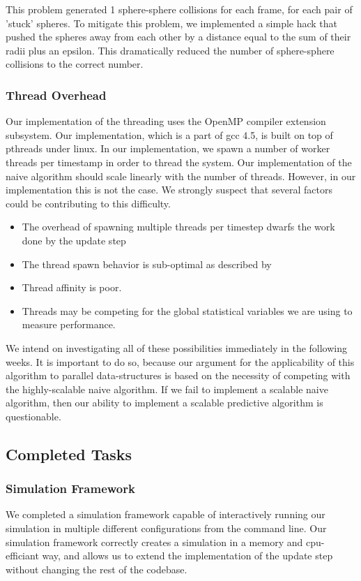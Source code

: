 \documentclass[conference]{IEEEtran}
\begin{document}
This problem generated 1 sphere-sphere collisions for each frame, for each pair of 'stuck' spheres.  To mitigate this problem, we implemented a simple hack that pushed the spheres away from each other by a distance equal to the sum of their radii plus an epsilon.
This dramatically reduced the number of sphere-sphere collisions to the correct number.

\subsubsection{Thread Overhead}
	Our implementation of the threading uses the OpenMP compiler extension subsystem.  Our implementation, which is a part of gcc 4.5, is built on top of pthreads under linux.  In our implementation, we 
spawn a number of worker threads per timestamp in order to thread the system.  Our implementation of the naive algorithm should scale linearly with the number of threads.  However, in our implementation this is not the case.  We strongly suspect that
several factors could be contributing to this difficulty.  

\begin{itemize}
	\item The overhead of spawning multiple threads per timestep dwarfs the work done by the update step
	\item The thread spawn behavior is sub-optimal as described by \cite{performance-critical}
	\item Thread affinity is poor.
	\item Threads may be competing for the global statistical variables we are using to measure performance.
\end{itemize}

We intend on investigating all of these possibilities immediately in the following weeks.  It is important to do so, because our argument for the applicability of this algorithm to parallel data-structures
is based on the necessity of competing with the highly-scalable naive algorithm.  If we fail to implement a scalable naive algorithm, then our ability to implement a scalable predictive algorithm is questionable.

\subsection{Completed Tasks}
\subsubsection{Simulation Framework}
We completed a simulation framework capable of interactively running our simulation in multiple different configurations from the command line.  Our simulation framework correctly
creates a simulation in a memory and cpu-efficiant way, and allows us to extend the implementation of the update step without changing the rest of the codebase.
\end{document}
